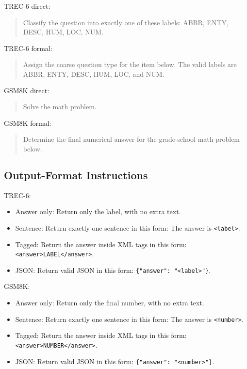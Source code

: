 \documentclass[11pt]{article}
\begin{document}
TREC-6 direct:

\begin{quote}
Classify the question into exactly one of these labels: ABBR, ENTY, DESC, HUM, LOC, NUM.
\end{quote}

TREC-6 formal:

\begin{quote}
Assign the coarse question type for the item below. The valid labels are ABBR, ENTY, DESC, HUM, LOC, and NUM.
\end{quote}

GSM8K direct:

\begin{quote}
Solve the math problem.
\end{quote}

GSM8K formal:

\begin{quote}
Determine the final numerical answer for the grade-school math problem below.
\end{quote}

\subsection{Output-Format Instructions}

TREC-6:

\begin{itemize}[leftmargin=*]
    \item Answer only: Return only the label, with no extra text.
    \item Sentence: Return exactly one sentence in this form: The answer is \verb|<label>|.
    \item Tagged: Return the answer inside XML tags in this form: \verb|<answer>LABEL</answer>|.
    \item JSON: Return valid JSON in this form: \verb|{"answer": "<label>"}|.
\end{itemize}

GSM8K:

\begin{itemize}[leftmargin=*]
    \item Answer only: Return only the final number, with no extra text.
    \item Sentence: Return exactly one sentence in this form: The answer is \verb|<number>|.
    \item Tagged: Return the answer inside XML tags in this form: \verb|<answer>NUMBER</answer>|.
    \item JSON: Return valid JSON in this form: \verb|{"answer": "<number>"}|.
\end{itemize}
\end{document}
